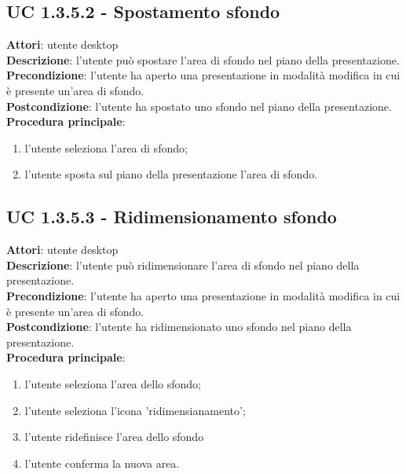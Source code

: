 \subsection{UC 1.3.5.2 - Spostamento sfondo}{
	\label{uc1.3.5.2}
	\textbf{Attori}: utente desktop \\
	\textbf{Descrizione}: l'utente può spostare l'area di sfondo nel piano della presentazione. \\
	\textbf{Precondizione}: l'utente ha aperto una presentazione in modalità modifica in cui è presente un'area di sfondo.	\\
	\textbf{Postcondizione}: l'utente ha spostato uno sfondo nel piano della presentazione.	\\
	\textbf{Procedura principale}:
	\begin{enumerate}
		\item l'utente seleziona l'area di sfondo;
		\item l'utente sposta sul piano della presentazione l'area di sfondo.
	\end{enumerate}
}
\subsection{UC 1.3.5.3 - Ridimensionamento sfondo}{
	\label{uc1.3.5.3}
	\textbf{Attori}: utente desktop \\
	\textbf{Descrizione}: l'utente può ridimensionare l'area di sfondo nel piano della presentazione. \\
	\textbf{Precondizione}: l'utente ha aperto una presentazione in modalità modifica in cui è presente un'area di sfondo.	\\
	\textbf{Postcondizione}: l'utente ha ridimensionato uno sfondo nel piano della presentazione.	\\
	\textbf{Procedura principale}:
	\begin{enumerate}
		\item l'utente seleziona l'area dello sfondo;
		\item l'utente seleziona l'icona 'ridimensianamento';
		\item l'utente ridefinisce l'area dello sfondo
		\item l'utente conferma la nuova area.
	\end{enumerate}
}
